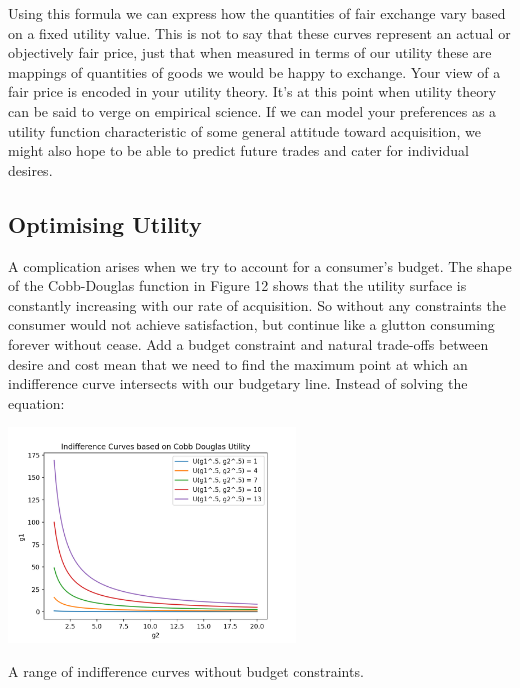 \documentclass{tufte-handout}
\begin{document}
\noindent Using this formula we can express how the quantities of fair exchange vary based on a fixed utility value. This is not to say that these curves represent an actual or objectively fair price, just that when measured in terms of our utility these are mappings of quantities of goods we would be happy to exchange. Your view of a fair price is encoded in your utility theory. It's at this point when utility theory can be said to verge on empirical science. If we can model your preferences as a utility function characteristic of some general attitude toward acquisition, we might also hope to be able to predict future trades and cater for individual desires. 

\subsection{Optimising Utility}
A complication arises when we try to account for a consumer's budget. The shape of the Cobb-Douglas function in Figure 12 shows that the utility surface is constantly increasing with our rate of acquisition. So without any constraints the consumer would not achieve satisfaction, but continue like a glutton consuming forever without cease. Add a budget constraint and natural trade-offs between desire and cost mean that we need to find the maximum point at which an indifference curve intersects with our budgetary line. Instead of solving the equation: 

\begin{marginfigure}
\includegraphics[width=3in, height=5.in]{Plots/indifference_curves.png}
\caption{A range of indifference curves without budget constraints.}
\end{marginfigure}
\end{document}
